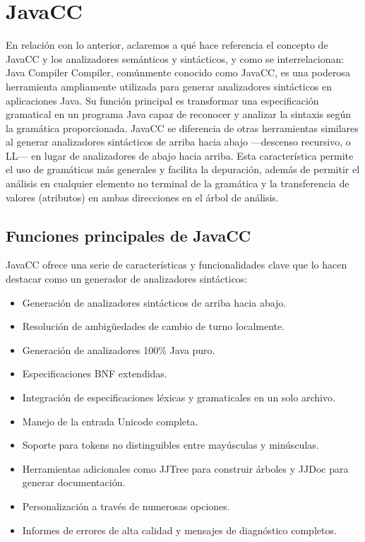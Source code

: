 \section{JavaCC}
\noindent En relación con lo anterior, aclaremos a qué hace referencia el concepto de JavaCC y los analizadores semánticos y sintácticos, y como se interrelacionan:
Java Compiler Compiler, comúnmente conocido como JavaCC, es una poderosa herramienta ampliamente utilizada para generar analizadores sintácticos en aplicaciones Java. Su función principal es transformar una especificación gramatical en un programa Java capaz de reconocer y analizar la sintaxis según la gramática proporcionada.
JavaCC se diferencia de otras herramientas similares al generar analizadores sintácticos de arriba hacia abajo ---descenso recursivo, o LL--- en lugar de analizadores de abajo hacia arriba. Esta característica permite el uso de gramáticas más generales y facilita la depuración, además de permitir el análisis en cualquier elemento no terminal de la gramática y la transferencia de valores (atributos) en ambas direcciones en el árbol de análisis.

\subsection{Funciones principales de JavaCC}
\noindent JavaCC ofrece una serie de características y funcionalidades clave que lo hacen destacar como un generador de analizadores sintácticos:
\begin{itemize}
	\item Generación de analizadores sintácticos de arriba hacia abajo.
	\item Resolución de ambigüedades de cambio de turno localmente.
	\item Generación de analizadores 100\% Java puro.
	\item Especificaciones BNF extendidas.
	\item Integración de especificaciones léxicas y gramaticales en un solo archivo.
	\item Manejo de la entrada Unicode completa.
	\item Soporte para tokens no distinguibles entre mayúsculas y minúsculas.
	\item Herramientas adicionales como JJTree para construir árboles y JJDoc para generar documentación.
	\item Personalización a través de numerosas opciones.
	\item Informes de errores de alta calidad y mensajes de diagnóstico completos.
\end{itemize}

